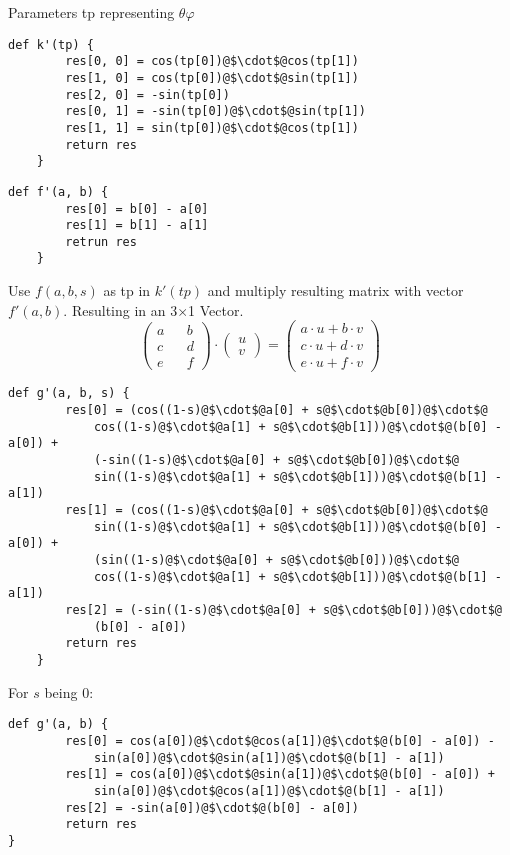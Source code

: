 Parameters tp representing $\theta\varphi$
\begin{lstlisting}[escapechar=@]
    def k'(tp) {
        res[0, 0] = cos(tp[0])@$\cdot$@cos(tp[1])
        res[1, 0] = cos(tp[0])@$\cdot$@sin(tp[1])
        res[2, 0] = -sin(tp[0])
        res[0, 1] = -sin(tp[0])@$\cdot$@sin(tp[1])
        res[1, 1] = sin(tp[0])@$\cdot$@cos(tp[1])
        return res
    }
\end{lstlisting}
\begin{lstlisting}[escapechar=@]
    def f'(a, b) {
        res[0] = b[0] - a[0]
        res[1] = b[1] - a[1]
        retrun res
    }
\end{lstlisting}
Use $f(a, b, s)$ as tp in $k'(tp)$ and multiply resulting matrix with vector $f'(a, b)$. Resulting in an 3$\times$1 Vector.
\begin{equation*}
    \begin{pmatrix}
        a && b \\
        c && d \\
        e && f
    \end{pmatrix}
    \cdot
    \begin{pmatrix}
        u \\
        v
    \end{pmatrix}
    =
    \begin{pmatrix}
        a\cdot u + b\cdot v \\
        c\cdot u + d\cdot v \\
        e\cdot u + f\cdot v
    \end{pmatrix}
\end{equation*}
\begin{lstlisting}[escapechar=@]
    def g'(a, b, s) {
        res[0] = (cos((1-s)@$\cdot$@a[0] + s@$\cdot$@b[0])@$\cdot$@
            cos((1-s)@$\cdot$@a[1] + s@$\cdot$@b[1]))@$\cdot$@(b[0] - a[0]) +
            (-sin((1-s)@$\cdot$@a[0] + s@$\cdot$@b[0])@$\cdot$@
            sin((1-s)@$\cdot$@a[1] + s@$\cdot$@b[1]))@$\cdot$@(b[1] - a[1])
        res[1] = (cos((1-s)@$\cdot$@a[0] + s@$\cdot$@b[0])@$\cdot$@
            sin((1-s)@$\cdot$@a[1] + s@$\cdot$@b[1]))@$\cdot$@(b[0] - a[0]) +
            (sin((1-s)@$\cdot$@a[0] + s@$\cdot$@b[0]))@$\cdot$@
            cos((1-s)@$\cdot$@a[1] + s@$\cdot$@b[1]))@$\cdot$@(b[1] - a[1])
        res[2] = (-sin((1-s)@$\cdot$@a[0] + s@$\cdot$@b[0]))@$\cdot$@
            (b[0] - a[0])
        return res
    }
\end{lstlisting}
For $s$ being $0$:
\begin{lstlisting}[escapechar=@]
    def g'(a, b) {
        res[0] = cos(a[0])@$\cdot$@cos(a[1])@$\cdot$@(b[0] - a[0]) -
            sin(a[0])@$\cdot$@sin(a[1])@$\cdot$@(b[1] - a[1])
        res[1] = cos(a[0])@$\cdot$@sin(a[1])@$\cdot$@(b[0] - a[0]) +
            sin(a[0])@$\cdot$@cos(a[1])@$\cdot$@(b[1] - a[1])
        res[2] = -sin(a[0])@$\cdot$@(b[0] - a[0])
        return res
}
\end{lstlisting}